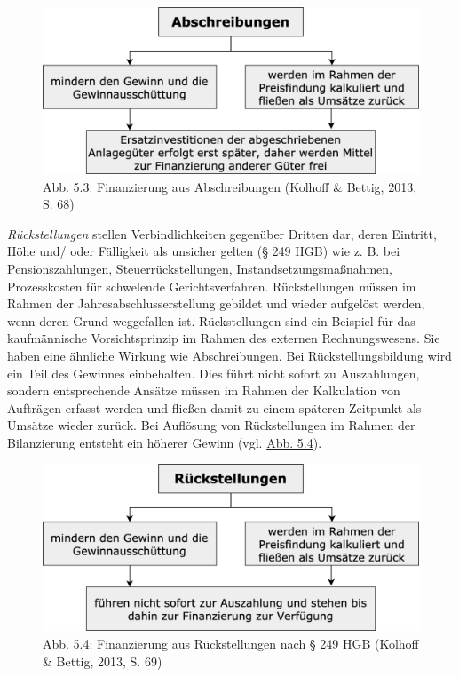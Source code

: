 \documentclass[
  letterpaper,
]{book}
\begin{document}
\begin{figure}

\includegraphics[width=0.7\linewidth,height=\textheight,keepaspectratio]{images/figure53.png} \hfill{}

\caption{Abb. 5.3: Finanzierung aus Abschreibungen (Kolhoff \& Bettig,
2013, S. 68)}

\end{figure}%

\emph{Rückstellungen} stellen Verbindlichkeiten gegenüber Dritten dar,
deren Eintritt, Höhe und/ oder Fälligkeit als unsicher gelten (§ 249
HGB) wie z. B. bei Pensionszahlungen, Steuerrückstellungen,
Instandsetzungsmaßnahmen, Prozesskosten für schwelende
Gerichtsverfahren. Rückstellungen müssen im Rahmen der
Jahresabschlusserstellung gebildet und wieder aufgelöst werden, wenn
deren Grund weggefallen ist. Rückstellungen sind ein Beispiel für das
kaufmännische Vorsichtsprinzip im Rahmen des externen Rechnungswesens.
Sie haben eine ähnliche Wirkung wie Abschreibungen. Bei
Rückstellungsbildung wird ein Teil des Gewinnes einbehalten. Dies führt
nicht sofort zu Auszahlungen, sondern entsprechende Ansätze müssen im
Rahmen der Kalkulation von Aufträgen erfasst werden und fließen damit zu
einem späteren Zeitpunkt als Umsätze wieder zurück. Bei Auflösung von
Rückstellungen im Rahmen der Bilanzierung entsteht ein höherer Gewinn
(vgl. \hyperref[figure54]{Abb. 5.4}).

\begin{figure}

\includegraphics[width=0.7\linewidth,height=\textheight,keepaspectratio]{images/figure54.png} \hfill{}

\caption{Abb. 5.4: Finanzierung aus Rückstellungen nach § 249 HGB
(Kolhoff \& Bettig, 2013, S. 69)}

\end{figure}%
\end{document}
